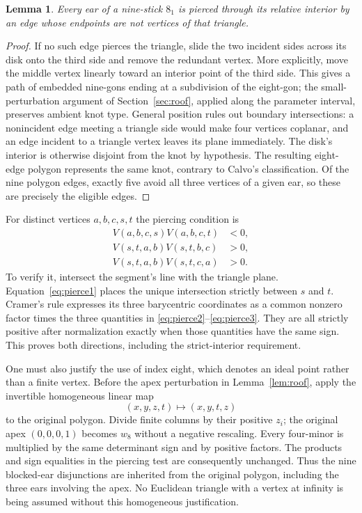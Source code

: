 \documentclass[11pt]{article}
\newtheorem{lemma}[theorem]{Lemma}
\begin{document}
\begin{lemma}\label{lem:ear}
Every ear of a nine-stick $8_1$ is pierced through its relative interior
by an edge whose endpoints are not vertices of that triangle.
\end{lemma}
\begin{proof}
If no such edge pierces the triangle, slide the two incident sides
across its disk onto the third side and remove the redundant vertex.
More explicitly, move the middle vertex linearly toward an interior
point of the third side. This gives a path of embedded nine-gons ending
at a subdivision of the eight-gon; the small-perturbation argument of
Section~\ref{sec:roof}, applied along the parameter interval, preserves
ambient knot type. General
position rules out boundary intersections: a nonincident edge meeting
a triangle side would make four vertices coplanar, and an edge incident
to a triangle vertex leaves its plane immediately. The disk's interior
is otherwise disjoint from the knot by hypothesis. The resulting
eight-edge polygon represents the same knot, contrary to Calvo's
classification. Of the nine polygon edges, exactly five avoid all
three vertices of a given ear, so these are precisely the eligible edges.
\end{proof}

For distinct vertices $a,b,c,s,t$ the piercing condition is
\begin{align}
 V(a,b,c,s)V(a,b,c,t)&<0,\label{eq:pierce1}\\
 V(s,t,a,b)V(s,t,b,c)&>0,\label{eq:pierce2}\\
 V(s,t,a,b)V(s,t,c,a)&>0.\label{eq:pierce3}
\end{align}
To verify it, intersect the segment's line with the triangle plane.
Equation~\eqref{eq:pierce1} places the unique intersection strictly
between $s$ and $t$. Cramer's rule expresses its three barycentric
coordinates as a common nonzero factor times the three quantities in
\eqref{eq:pierce2}--\eqref{eq:pierce3}. They are all strictly positive
after normalization exactly when those quantities have the same sign.
This proves both directions, including the strict-interior requirement.

One must also justify the use of index eight, which denotes an ideal
point rather than a finite vertex. Before the apex perturbation in
Lemma~\ref{lem:roof}, apply the invertible homogeneous linear map
\[
 (x,y,z,t)\longmapsto(x,y,t,z)
\]
to the original polygon. Divide finite columns by their positive $z_i$;
the original apex $(0,0,0,1)$ becomes $w_8$ without a negative rescaling.
Every four-minor is multiplied by the same determinant sign and by
positive factors. The products and sign equalities in the piercing
test are consequently unchanged. Thus the nine blocked-ear disjunctions
are inherited from the original polygon, including the three ears
involving the apex. No Euclidean triangle with a vertex at infinity
is being assumed without this homogeneous justification.
\end{document}
